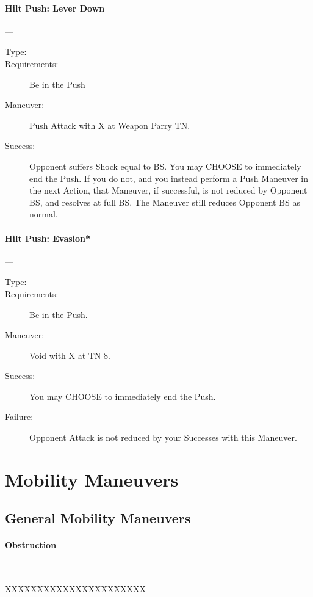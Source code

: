 \documentclass[oneside,11pt,english]{book}
\begin{document}
\paragraph{\large\label{man:Hilt Push: Lever Down}Hilt Push: Lever Down}---\quad{\large[2+X]}
\vspace{-10pt}\begin{description}
\item [Type:]
\item [Requirements:] Be in the Push 
\item [Maneuver:] Push Attack with X at Weapon Parry TN. 
\item [Success:] Opponent suffers Shock equal to BS. You may CHOOSE to immediately end the Push. If you 
do not, and you instead perform a Push Maneuver in the next Action, that Maneuver, if successful, is not 
reduced by Opponent BS, and resolves at full BS. The Maneuver still reduces Opponent BS as normal. 
\end{description}

\paragraph{\large\label{man:Hilt Push: Evasion*}Hilt Push: Evasion*}---\quad{\large[2+Encumbrance+X]}
\vspace{-10pt}\begin{description} 
\item [Type:] 
\item [Requirements:] Be in the Push. 
\item [Maneuver:] Void with X at TN 8. 
\item [Success:] You may CHOOSE to immediately end the Push. 
\item [Failure:] Opponent Attack is not reduced by your Successes with this Maneuver. 
\end{description}
\section{Mobility Maneuvers}
\subsection{General Mobility Maneuvers}
\paragraph{\large\label{man:Obstruction}Obstruction}---\quad{\large[????????]}

XXXXXXXXXXXXXXXXXXXXXX 
\end{document}

